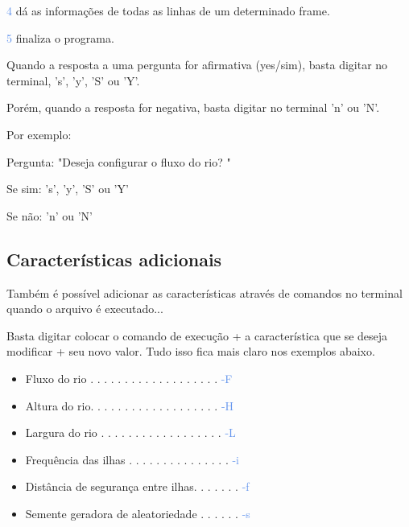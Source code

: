 \documentclass[a4paper,12pt]{article}
\begin{document}
  \textcolor{CornflowerBlue}{4} dá as informações de todas as linhas de um 
  determinado frame.
  
  \textcolor{CornflowerBlue}{5} finaliza o programa.
  
  
  Quando a resposta a uma pergunta for afirmativa (yes/sim), basta digitar no 
  terminal, 's', 'y', 'S' ou 'Y'.
  
  Porém, quando a resposta for negativa, basta digitar no terminal 'n' ou 'N'.
  \bigskip
  
  Por exemplo:
  
  Pergunta: "\textcolor{NavyBlue}{Deseja configurar o fluxo do rio? }"
  
  Se sim:   '\textcolor{NavyBlue}{s}', '\textcolor{NavyBlue}{y}',
  '\textcolor{NavyBlue}{S}' ou '\textcolor{NavyBlue}{Y}'
  
  Se não:   '\textcolor{NavyBlue}{n}' ou '\textcolor{NavyBlue}{N}'


\newpage %


  \bigskip
  \subsection{\textcolor{NavyBlue}{Características adicionais}}

  Também é possível adicionar as características através de comandos no terminal 
  quando o arquivo é executado...

  Basta digitar colocar o comando de execução + a característica que se deseja 
  modificar + seu novo valor. Tudo isso fica mais claro nos exemplos abaixo.

  \bigskip
  \begin{itemize}
  
  \item Fluxo do rio . . . . . . . . . . . . . . . . . . .  \textcolor{CornflowerBlue}{-F}
  \item Altura do rio. . . . . . . . . . . . . . . . . . .  \textcolor{CornflowerBlue}{-H}
  \item Largura do rio . . . . . . . . . . . . . . . . . .  \textcolor{CornflowerBlue}{-L}
  \item Frequência das ilhas . . . . . . . . . . . . . . .  \textcolor{CornflowerBlue}{-i} 
  \item Distância de segurança entre ilhas. . . . . . .  \textcolor{CornflowerBlue}{-f}
  \item Semente geradora de aleatoriedade . . . . . .  \textcolor{CornflowerBlue}{-s}
  
  \end{itemize}
  \bigskip
  
\end{document}
